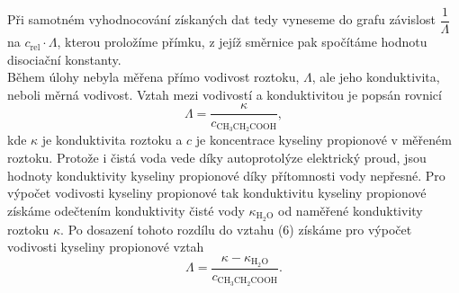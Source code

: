 \documentclass[12pt,a4paper]{article}
\def\ri#1{\mathrm{#1}}
\begin{document}
Při samotném vyhodnocování získaných dat tedy vyneseme do grafu závislost $\dfrac{1}{\Lambda}$ na $c_\ri{rel}\cdot \Lambda$, kterou proložíme přímku, z jejíž směrnice pak spočítáme hodnotu disociační konstanty.\\
Během úlohy nebyla měřena přímo vodivost roztoku, $\Lambda$, ale jeho konduktivita, neboli měrná vodivost. Vztah mezi vodivostí a konduktivitou je popsán rovnicí
\begin{equation}
	\Lambda = \dfrac{\kappa}{c_\ri{CH_3CH_2COOH}},
\end{equation}
kde $\kappa$ je konduktivita roztoku a $c$ je koncentrace kyseliny propionové v měřeném roztoku. Protože i čistá voda vede díky autoprotolýze elektrický proud, jsou hodnoty konduktivity kyseliny propionové díky přítomnosti vody nepřesné. Pro výpočet vodivosti kyseliny propionové tak konduktivitu kyseliny propionové získáme odečtením konduktivity čisté vody $\kappa_\ri{H_2O}$ od naměřené konduktivity roztoku $\kappa$. Po dosazení tohoto rozdílu do vztahu (6) získáme pro výpočet vodivosti kyseliny propionové vztah
\begin{equation}
	\Lambda = \dfrac{\kappa -\kappa_\ri{H_2O}}{c_\ri{CH_3CH_2COOH}}.
\end{equation}
\end{document}
